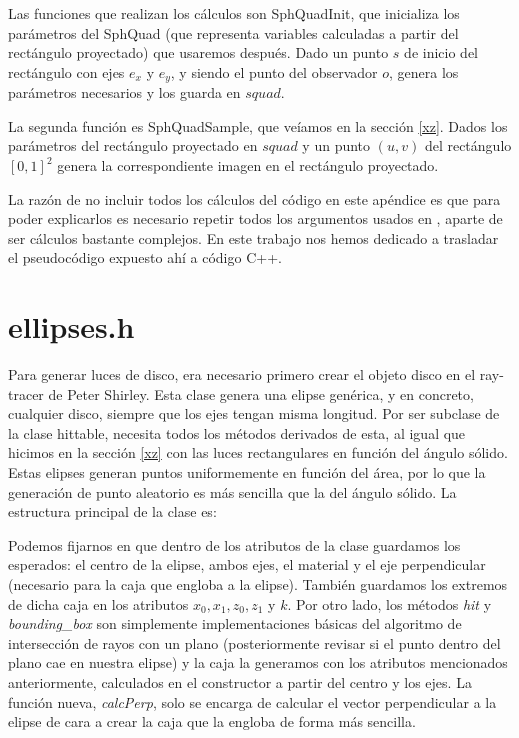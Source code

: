 \documentclass{scrbook}
\begin{document}
Las funciones que realizan los cálculos son SphQuadInit, que inicializa los parámetros del SphQuad (que representa variables calculadas a partir del rectángulo proyectado) que usaremos después. Dado un punto $s$ de inicio del rectángulo con ejes $e_x$ y $e_y$, y siendo el punto del observador $o$, genera los parámetros necesarios y los guarda en $squad$.


La segunda función es SphQuadSample, que veíamos en la sección \ref{xz}. Dados los parámetros del rectángulo proyectado en $squad$ y un punto $(u,v)$ del rectángulo $[0,1]^2$ genera la correspondiente imagen en el rectángulo proyectado.


La razón de no incluir todos los cálculos del código en este apéndice es que para poder explicarlos es necesario repetir todos los argumentos usados en \cite{ur2013}, aparte de ser cálculos bastante complejos. En este trabajo nos hemos dedicado a trasladar el pseudocódigo expuesto ahí a código C++.
\section{ellipses.h}
\label{elipseCod}
Para generar luces de disco, era necesario primero crear el objeto disco en el ray-tracer de Peter Shirley. Esta clase genera una elipse genérica, y en concreto, cualquier disco, siempre que los ejes tengan misma longitud. Por ser subclase de la clase hittable, necesita todos los métodos derivados de esta, al igual que hicimos en la sección \ref{xz} con las luces rectangulares en función del ángulo sólido. Estas elipses generan puntos uniformemente en función del área, por lo que la generación de punto aleatorio es más sencilla que la del ángulo sólido. La estructura principal de la clase es:


Podemos fijarnos en que dentro de los atributos de la clase guardamos los esperados: el centro de la elipse, ambos ejes, el material y el eje perpendicular (necesario para la caja que engloba a la elipse). También guardamos los extremos de dicha caja en los atributos $x_0, x_1, z_0, z_1$ y $k$. Por otro lado, los métodos \textit{hit} y \textit{bounding\_box} son simplemente implementaciones básicas del algoritmo de intersección de rayos con un plano (posteriormente revisar si el punto dentro del plano cae en nuestra elipse) y la caja la generamos con los atributos mencionados anteriormente, calculados en el constructor a partir del centro y los ejes. La función nueva, \textit{calcPerp}, solo se encarga de calcular el vector perpendicular a la elipse de cara a crear la caja que la engloba de forma más sencilla. 
\end{document}
